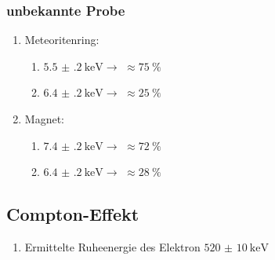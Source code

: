 \documentclass[12pt,english,ngerman]{scrartcl}
\begin{document}
\subsubsection{unbekannte Probe}
\begin{enumerate}
	\item Meteoritenring:
	      \begin{enumerate}
		      \item $\SI{5.5(2)}{\kilo\eV} \rightarrow $  $\approx \SI{75}{\percent}$
		      \item $\SI{6.4(2)}{\kilo\eV} \rightarrow $  $\approx \SI{25}{\percent}$
	      \end{enumerate}
	\item Magnet:
	      \begin{enumerate}
		      \item $\SI{7.4(2)}{\kilo\eV} \rightarrow $  $\approx \SI{72}{\percent}$
		      \item $\SI{6.4(2)}{\kilo\eV} \rightarrow $  $\approx \SI{28}{\percent}$
	      \end{enumerate}
\end{enumerate}

\subsection{Compton-Effekt}

\begin{enumerate}
	\item Ermittelte Ruheenergie des Elektron $\SI{520(10)}{\kilo\electronvolt}$
\end{enumerate}

\newpage
\printbibliography
\listoffigures
\listoftables
\end{document}
